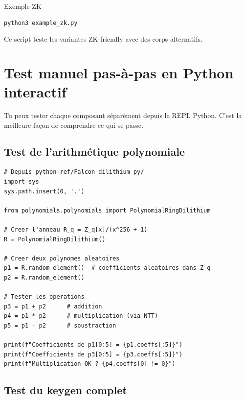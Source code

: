 \documentclass[12pt, a4paper]{article}
\begin{document}
\begin{cmdbox}{Exemple ZK}
\begin{lstlisting}[style=bash]
python3 example_zk.py
\end{lstlisting}
\end{cmdbox}

Ce script teste les variantes ZK-friendly avec des corps alternatifs.

\section{Test manuel pas-à-pas en Python interactif}

Tu peux tester chaque composant séparément depuis le REPL Python.
C'est la meilleure façon de comprendre ce qui se passe.

\subsection{Test de l'arithmétique polynomiale}

\begin{lstlisting}[style=python]
# Depuis python-ref/Falcon_dilithium_py/
import sys
sys.path.insert(0, '.')

from polynomials.polynomials import PolynomialRingDilithium

# Creer l'anneau R_q = Z_q[x]/(x^256 + 1)
R = PolynomialRingDilithium()

# Creer deux polynomes aleatoires
p1 = R.random_element()  # coefficients aleatoires dans Z_q
p2 = R.random_element()

# Tester les operations
p3 = p1 + p2      # addition
p4 = p1 * p2      # multiplication (via NTT)
p5 = p1 - p2      # soustraction

print(f"Coefficients de p1[0:5] = {p1.coeffs[:5]}")
print(f"Coefficients de p3[0:5] = {p3.coeffs[:5]}")
print(f"Multiplication OK ? {p4.coeffs[0] != 0}")
\end{lstlisting}

\subsection{Test du keygen complet}
\end{document}
